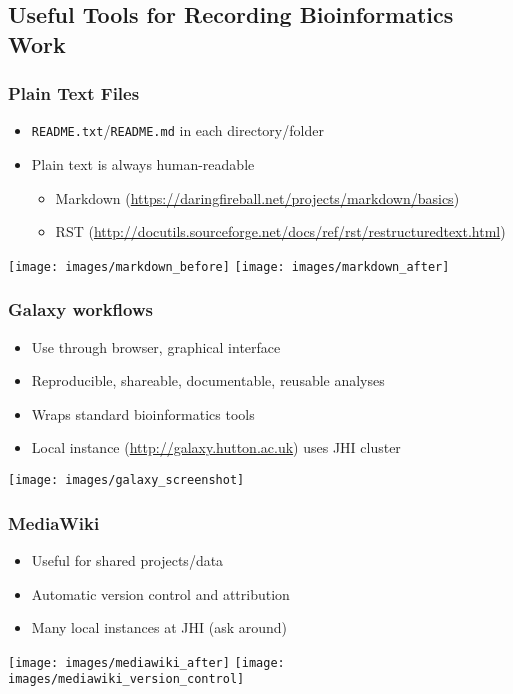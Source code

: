 %

\subsection{Useful Tools for Recording Bioinformatics Work}
\begin{frame}
  \frametitle{Plain Text Files}
  \begin{itemize}
    \item \texttt{README.txt}/\texttt{README.md} in each directory/folder
    \item Plain text is always human-readable
    \begin{itemize}
      \item Markdown (\url{https://daringfireball.net/projects/markdown/basics})
      \item RST (\url{http://docutils.sourceforge.net/docs/ref/rst/restructuredtext.html})
    \end{itemize}
  \end{itemize}
  \begin{center}
    \texttt{[image: images/markdown\_before]}
    \texttt{[image: images/markdown\_after]}
  \end{center}
\end{frame}
   
\begin{frame}
  \frametitle{Galaxy workflows}
  \begin{itemize}
    \item Use through browser, graphical interface
    \item Reproducible, shareable, documentable, reusable analyses
    \item Wraps standard bioinformatics tools
    \item Local instance (\url{http://galaxy.hutton.ac.uk}) uses JHI cluster
  \end{itemize}
  \begin{center}
    \texttt{[image: images/galaxy\_screenshot]}
  \end{center}
\end{frame}      
   
\begin{frame}
  \frametitle{MediaWiki}
  \begin{itemize}
    \item Useful for shared projects/data
    \item Automatic version control and attribution
    \item Many local instances at JHI (ask around)
  \end{itemize}
  \begin{center}
    \texttt{[image: images/mediawiki\_after]}
    \texttt{[image: images/mediawiki\_version\_control]}     
  \end{center}
\end{frame}
   

